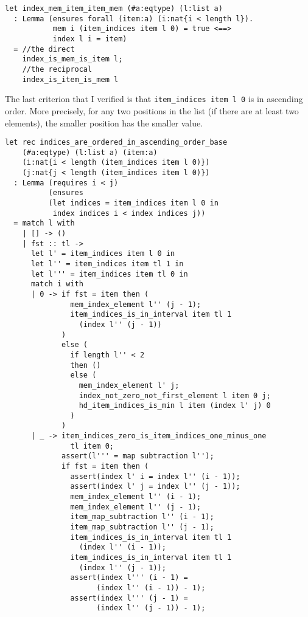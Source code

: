 \begin{verbatim}
let index_mem_item_item_mem (#a:eqtype) (l:list a)
  : Lemma (ensures forall (item:a) (i:nat{i < length l}).
           mem i (item_indices item l 0) = true <==>
           index l i = item)
  = //the direct
    index_is_mem_is_item l;
    //the reciprocal
    index_is_item_is_mem l
\end{verbatim}

The last criterion that I verified is that \texttt{item\_indices item l 0} is in ascending order. More precisely, for any two positions in the list (if there are at least two elements), the smaller position has the smaller value. 

\begin{verbatim}
let rec indices_are_ordered_in_ascending_order_base 
    (#a:eqtype) (l:list a) (item:a) 
    (i:nat{i < length (item_indices item l 0)}) 
    (j:nat{j < length (item_indices item l 0)})
  : Lemma (requires i < j)
          (ensures
          (let indices = item_indices item l 0 in 
           index indices i < index indices j))
  = match l with
    | [] -> ()
    | fst :: tl -> 
      let l' = item_indices item l 0 in 
      let l'' = item_indices item tl 1 in
      let l''' = item_indices item tl 0 in
      match i with 
      | 0 -> if fst = item then (
               mem_index_element l'' (j - 1);
               item_indices_is_in_interval item tl 1 
                 (index l'' (j - 1))
             )
             else (
               if length l'' < 2
               then ()
               else (
                 mem_index_element l' j;
                 index_not_zero_not_first_element l item 0 j;
                 hd_item_indices_is_min l item (index l' j) 0
               )
             )
      | _ -> item_indices_zero_is_item_indices_one_minus_one
               tl item 0;
             assert(l''' = map subtraction l'');
             if fst = item then (
               assert(index l' i = index l'' (i - 1));
               assert(index l' j = index l'' (j - 1));
               mem_index_element l'' (i - 1);
               mem_index_element l'' (j - 1);
               item_map_subtraction l'' (i - 1);
               item_map_subtraction l'' (j - 1);
               item_indices_is_in_interval item tl 1 
                 (index l'' (i - 1));
               item_indices_is_in_interval item tl 1 
                 (index l'' (j - 1));
               assert(index l''' (i - 1) = 
                     (index l'' (i - 1)) - 1);
               assert(index l''' (j - 1) = 
                     (index l'' (j - 1)) - 1);

\end{verbatim}
